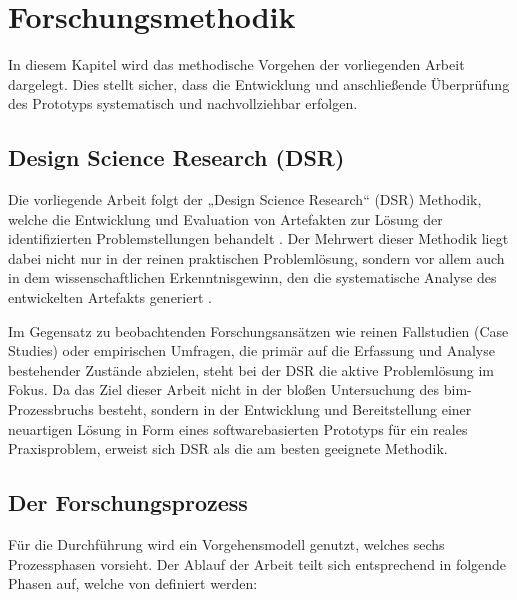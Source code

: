 \section{Forschungsmethodik}
\label{sec:methodology}

In diesem Kapitel wird das methodische Vorgehen der vorliegenden Arbeit dargelegt. Dies stellt sicher, dass die Entwicklung und anschließende Überprüfung des Prototyps systematisch und nachvollziehbar erfolgen.

\subsection{Design Science Research (DSR)}

Die vorliegende Arbeit folgt der „Design Science Research“ (DSR) Methodik, welche die Entwicklung und Evaluation von Artefakten zur Lösung der identifizierten Problemstellungen behandelt \cite{peffers2007design}. Der Mehrwert dieser Methodik liegt dabei nicht nur in der reinen praktischen Problemlösung, sondern vor allem auch in dem wissenschaftlichen Erkenntnisgewinn, den die systematische Analyse des entwickelten Artefakts generiert \cite{peffers2007design, hevner2004design}.

Im Gegensatz zu beobachtenden Forschungsansätzen wie reinen Fallstudien (Case Studies) oder empirischen Umfragen, die primär auf die Erfassung und Analyse bestehender Zustände abzielen, steht bei der DSR die aktive Problemlösung im Fokus. Da das Ziel dieser Arbeit nicht in der bloßen Untersuchung des \gls{bim}-Prozessbruchs besteht, sondern in der Entwicklung und Bereitstellung einer neuartigen Lösung in Form eines softwarebasierten Prototyps für ein reales Praxisproblem, erweist sich DSR als die am besten geeignete Methodik.

\subsection{Der Forschungsprozess}

Für die Durchführung wird ein Vorgehensmodell genutzt, welches sechs Prozessphasen vorsieht. Der Ablauf der Arbeit teilt sich entsprechend in folgende Phasen auf, welche von \cite{peffers2007design} definiert werden:

